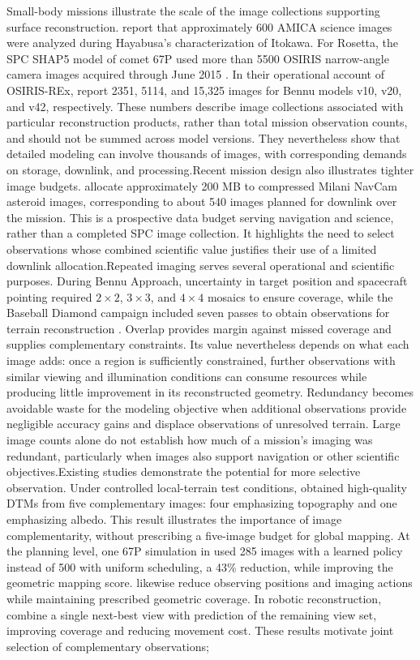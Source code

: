Small-body missions illustrate the scale of the image collections supporting surface reconstruction. \citet{gaskell2008} report that approximately 600 AMICA science images were analyzed during Hayabusa's characterization of Itokawa. For Rosetta, the SPC SHAP5 model of comet 67P used more than 5500 OSIRIS narrow-angle camera images acquired through June 2015 \citep{preusker2017}. In their operational account of OSIRIS-REx, \citet{palmer2022} report 2351, 5114, and 15,325 images for Bennu models v10, v20, and v42, respectively. These numbers describe image collections associated with particular reconstruction products, rather than total mission observation counts, and should not be summed across model versions. They nevertheless show that detailed modeling can involve thousands of images, with corresponding demands on storage, downlink, and processing.Recent mission design also illustrates tighter image budgets. \citet{ferrari2026navcam} allocate approximately 200 MB to compressed Milani NavCam asteroid images, corresponding to about 540 images planned for downlink over the mission. This is a prospective data budget serving navigation and science, rather than a completed SPC image collection. It highlights the need to select observations whose combined scientific value justifies their use of a limited downlink allocation.Repeated imaging serves several operational and scientific purposes. During Bennu Approach, uncertainty in target position and spacecraft pointing required $2\times2$, $3\times3$, and $4\times4$ mosaics to ensure coverage, while the Baseball Diamond campaign included seven passes to obtain observations for terrain reconstruction \citep{palmer2022}. Overlap provides margin against missed coverage and supplies complementary constraints. Its value nevertheless depends on what each image adds: once a region is sufficiently constrained, further observations with similar viewing and illumination conditions can consume resources while producing little improvement in its reconstructed geometry. Redundancy becomes avoidable waste for the modeling objective when additional observations provide negligible accuracy gains and displace observations of unresolved terrain. Large image counts alone do not establish how much of a mission's imaging was redundant, particularly when images also support navigation or other scientific objectives.Existing studies demonstrate the potential for more selective observation. Under controlled local-terrain test conditions, \citet{palmer2024geometry} obtained high-quality DTMs from five complementary images: four emphasizing topography and one emphasizing albedo. This result illustrates the importance of image complementarity, without prescribing a five-image budget for global mapping. At the planning level, one 67P simulation in \citet{piccinin2022} used 285 images with a learned policy instead of 500 with uniform scheduling, a 43\% reduction, while improving the geometric mapping score. \citet{wang2025} likewise reduce observing positions and imaging actions while maintaining prescribed geometric coverage. In robotic reconstruction, \citet{pan2025} combine a single next-best view with prediction of the remaining view set, improving coverage and reducing movement cost. These results motivate joint selection of complementary observations; 